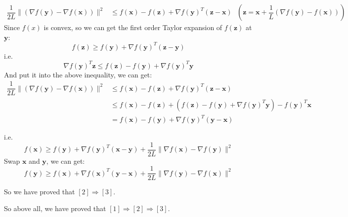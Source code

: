 \begin{itemize}
\begin{align*}
    \dfrac{1}{2L}\|(\nabla f(\mathbf{y})-\nabla f(\mathbf{x}))\|^2 &\leq f(\mathbf{x}) - f(\mathbf{z}) + \nabla f(\mathbf{y})^T(\mathbf{z}-\mathbf{x}) \text{\ \ \ \ \ \ \ $\left(\mathbf{z}=\mathbf{x}+\dfrac{1}{L}(\nabla f(\mathbf{y})-f(\mathbf{x}))\right)$}
\end{align*}
Since $f(x)$ is convex, so we can get the first order Taylor expansion of $f(\mathbf{z})$ at $\mathbf{y}$:
$$f(\mathbf{z}) \geq f(\mathbf{y})+\nabla f(\mathbf{y})^T(\mathbf{z}-\mathbf{y})$$
i.e.
$$\nabla f(\mathbf{y})^T\mathbf{z}\leq f(\mathbf{z})-f(\mathbf{y})+\nabla f(\mathbf{y})^T\mathbf{y}$$
And put it into the above inequality, we can get:
\begin{align*}
    \dfrac{1}{2L}\|(\nabla f(\mathbf{y})-\nabla f(\mathbf{x}))\|^2 &\leq f(\mathbf{x}) - f(\mathbf{z}) + \nabla f(\mathbf{y})^T(\mathbf{z}-\mathbf{x}) \\
    &\leq f(\mathbf{x}) - f(\mathbf{z}) + \left(f(\mathbf{z})-f(\mathbf{y})+\nabla f(\mathbf{y})^T\mathbf{y}\right) -f(\mathbf{y})^T\mathbf{x} \\
    &= f(\mathbf{x}) - f(\mathbf{y}) + \nabla f(\mathbf{y})^T(\mathbf{y} - \mathbf{x})
\end{align*}

i.e.
$$f(\mathbf{x}) \geq f(\mathbf{y})+\nabla f(\mathbf{y})^T(\mathbf{x}-\mathbf{y})+\frac{1}{2 L}\|\nabla f(\mathbf{x})-\nabla f(\mathbf{y})\|^2$$
Swap $\mathbf{x}$ and $\mathbf{y}$, we can get:
$$f(\mathbf{y}) \geq f(\mathbf{x})+\nabla f(\mathbf{x})^T(\mathbf{y}-\mathbf{x})+\frac{1}{2 L}\|\nabla f(\mathbf{y})-\nabla f(\mathbf{x})\|^2$$
    
So we have proved that $[2] \Rightarrow[3]$.

\end{itemize}

So above all, we have proved that $[1] \Rightarrow[2] \Rightarrow[3]$.

\newpage